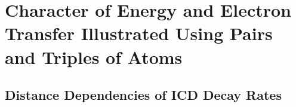 \section{Character of Energy and Electron Transfer Illustrated Using Pairs and Triples of Atoms}

\subsection{Distance Dependencies of ICD Decay Rates}
